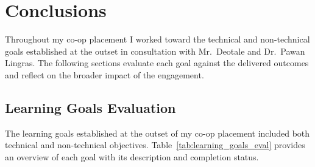 ﻿%

\chapter{Conclusions}
\label{chap:conclusions}

Throughout my co-op placement I worked toward the technical and non-technical
goals established at the outset in consultation with Mr.\ Deotale and
Dr.\ Pawan Lingras. The following sections evaluate each goal against the
delivered outcomes and reflect on the broader impact of the engagement.


\section{Learning Goals Evaluation}
\label{sec:learning_goals_eval}


The learning goals established at the outset of my co-op placement included both technical and non-technical objectives. Table~\ref{tab:learning_goals_eval} provides an overview of each goal with its description and completion status.

